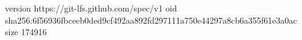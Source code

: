 version https://git-lfs.github.com/spec/v1
oid sha256:6f56936fbceeb0ded9cf492aa892fd297111a750e44297a8cb6a355f61e3a0ac
size 174916
